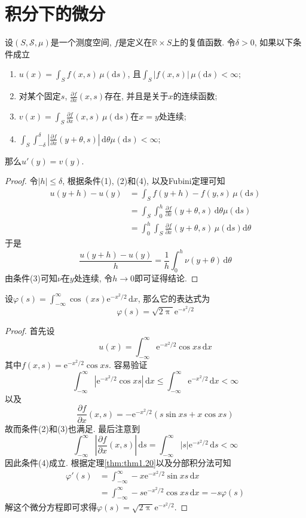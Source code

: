 \documentclass[cn, 12pt, math=mtpro2, bibstyle=apa, blue, twocol]{elegantbook}
\newcommand{\R}{\mathbb{R}}
\newcommand{\SE}{\mathcal{S}}
\begin{document}
\section{积分下的微分}
\begin{theorem}\label{thm:thm1.20}
  设$(S,\SE,\mu)$是一个测度空间, $f$是定义在$\R\times S$上的复值函数. 令$\delta>0$, 如果以下条件成立
  \begin{enumerate}[label=(\arabic*)]
    \item $u(x)=\int_Sf(x,s)\,\mu(\text{d}s)$, 且$\int_S|f(x,s)|\,\mu(\text{d}s)<\infty$;
    \item 对某个固定$s$, $\frac{\partial f}{\partial x}(x,s)$存在, 并且是关于$x$的连续函数;
    \item $v(x)=\int_S\frac{\partial f}{\partial x}(x,s)\,\mu(\text{d}s)$在$x=y$处连续;
    \item $\int_S\int_{-\delta}^{\delta}\left|\frac{\partial f}{\partial x}(y+\theta,s)\right|\,\text{d}\theta\mu(\text{d}s)<\infty$;
  \end{enumerate}
  那么$u'(y)=v(y)$.
\end{theorem}
\begin{proof}
  令$|h|\leq\delta$, 根据条件(1), (2)和(4), 以及Fubini定理可知
  \begin{align*}
  u(y+h)-u(y)&=\int_S f(y+h)-f(y,s)\,\mu(\text{d}s) \\
  &=\int_{S}\int_{0}^{h}\frac{\partial f}{\partial x}(y+\theta,s)\,\text{d}\theta\mu(\text{d}s) \\
  &=\int_{0}^{h}\int_S \frac{\partial f}{\partial x}(y+\theta,s)\,\mu(\text{d}s)\text{d}\theta
  \end{align*}
  于是
  $$\frac{u(y+h)-u(y)}{h}=\frac{1}{h}\int_{0}^{h}\nu(y+\theta)\,\text{d}\theta$$
  由条件(3)可知$\nu$在$y$处连续, 令$h\to0$即可证得结论.
\end{proof}
\begin{example}
设$\varphi(s)=\int_{-\infty}^{\infty}\cos (xs)\text{e}^{-x^2/2}\,\text{d}x$, 那么它的表达式为
$$\varphi(s)=\sqrt{2\uppi}\text{e}^{-s^2/2}$$
\end{example}
\begin{proof}
  首先设
  $$u(x)=\int_{-\infty}^{\infty}\text{e}^{-x^2/2}\cos xs\,\text{d}x$$
  其中$f(x,s)=\text{e}^{-x^2/2}\cos xs$. 容易验证
  $$\int_{-\infty}^{\infty}|\text{e}^{-x^2/2}\cos xs|\,\text{d}x\leq \int_{-\infty}^{\infty}\text{e}^{-x^2/2}\,\text{d}x<\infty$$
  以及
  $$\frac{\partial f}{\partial x}(x,s)=-\text{e}^{-x^2/2}(s\sin xs+x\cos xs)$$
  故而条件(2)和(3)也满足. 最后注意到
  $$\int_{-\infty}^{\infty}\left|\frac{\partial f}{\partial x}(x,s)\right|\,\text{d}s=\int_{-\infty}^{\infty}|s|\text{e}^{-s^2/2}\,\text{d}s<\infty$$
  因此条件(4)成立. 根据定理\ref{thm:thm1.20}以及分部积分法可知
  \begin{align*}
  \varphi'(s)&=\int_{-\infty}^{\infty}-x\text{e}^{-x^2/2}\sin xs\,\text{d}x \\
  &=\int_{-\infty}^{\infty}-s\text{e}^{-x^2/2}\cos xs\,\text{d}x=-s\varphi(s)
  \end{align*}
  解这个微分方程即可求得$\varphi(s)=\sqrt{2\uppi}\text{e}^{-s^2/2}$.
\end{proof}
\end{document}
